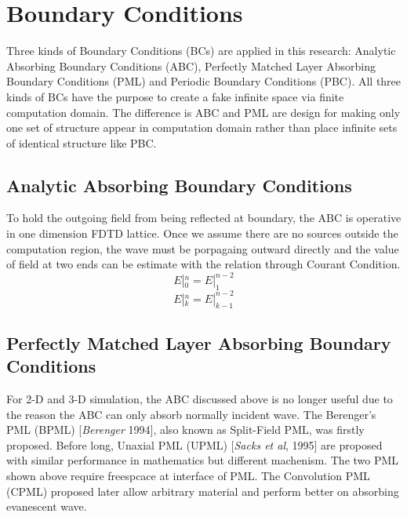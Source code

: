 \section{Boundary Conditions}
\label{sec:bcs}
Three kinds of Boundary Conditions (BCs) are applied in this research: Analytic Absorbing Boundary Conditions (ABC),
Perfectly Matched Layer Absorbing Boundary Conditions (PML) and Periodic Boundary Conditions (PBC). All three kinds of
BCs have the purpose to create a fake infinite space via finite computation domain. The difference is ABC and PML are
design for making only one set of structure appear in computation domain rather than place infinite sets of identical
structure like PBC.


\subsection{Analytic Absorbing Boundary Conditions}
To hold the outgoing field from being reflected at boundary, the ABC is operative in one dimension FDTD lattice. Once we
assume there are no sources outside the computation region, the wave must be porpagaing outward directly and the value
of field at two ends can be estimate with the relation through Courant Condition.
\begin{equation}
  E|_0^n = E|_1^{n-2}
\end{equation}
\begin{equation}
  E|_k^n = E|_{k-1}^{n-2}
\end{equation}



\subsection{Perfectly Matched Layer Absorbing Boundary Conditions}
\label{subsec:pml}
For 2-D and 3-D simulation, the ABC discussed above is no longer useful due to the reason the ABC can only absorb
normally incident wave. The Berenger's PML (BPML) [\textit{Berenger} 1994], also known as Split-Field PML, was firstly
proposed. Before long, Unaxial PML (UPML) [\textit{Sacks et al}, 1995] are proposed with similar performance in
mathematics but different machenism. The two PML shown above require freespcace at interface of PML. The Convolution PML
(CPML) proposed later allow arbitrary material and perform better on absorbing evanescent wave.

